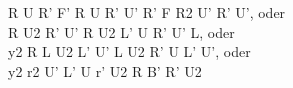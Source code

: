 R U R' F' R U R' U' R' F R2 U' R' U', oder\\
R U2 R' U' R U2 L' U R' U' L, oder\\
y2 R L U2 L' U' L U2 R' U L' U', oder\\
y2 r2 U' L' U r' U2 R B' R' U2\\
